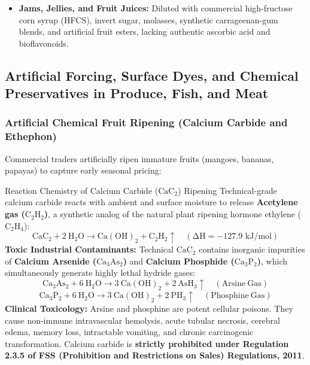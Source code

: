 \documentclass[11pt,a4paper,oneside]{article}
\begin{document}
\begin{itemize}[leftmargin=*]
\begin{itemize}
        \item \textit{Counterfeit Silver Foil (*Vark*):} Pure edible silver leaf ($99.9\%\ \mathrm{Ag}$, thickness $\approx 0.2\,\mu\text{m}$) is adulterated with or entirely replaced by \textbf{Toxic Aluminum Foil ($\mathrm{Al}$)}. Aluminum is a cumulative neurotoxin linked to microcytic anemia, neurofibrillary degeneration, and bone demineralization (osteomalacia).
    \end{itemize}
    \item \textbf{Jams, Jellies, and Fruit Juices:} Diluted with commercial high-fructose corn syrup (HFCS), invert sugar, molasses, synthetic carrageenan-gum blends, and artificial fruit esters, lacking authentic ascorbic acid and bioflavonoids.
\end{itemize}

\subsection{Artificial Forcing, Surface Dyes, and Chemical Preservatives in Produce, Fish, and Meat}

\subsubsection{Artificial Chemical Fruit Ripening (Calcium Carbide and Ethephon)}
Commercial traders artificially ripen immature fruits (mangoes, bananas, papayas) to capture early seasonal pricing:
\begin{formulabox}{Reaction Chemistry of Calcium Carbide ($\mathrm{CaC_2}$) Ripening}
Technical-grade calcium carbide reacts with ambient and surface moisture to release \textbf{Acetylene gas ($\mathrm{C_2H_2}$)}, a synthetic analog of the natural plant ripening hormone ethylene ($\mathrm{C_2H_4}$):
$$\mathrm{CaC_2 + 2\ H_2O \longrightarrow Ca(OH)_2 + C_2H_2\uparrow \quad (\Delta H = -127.9\text{ kJ/mol})}$$
\textbf{Toxic Industrial Contaminants:} Technical $\mathrm{CaC_2}$ contains inorganic impurities of \textbf{Calcium Arsenide ($\mathrm{Ca_3As_2}$)} and \textbf{Calcium Phosphide ($\mathrm{Ca_3P_2}$)}, which simultaneously generate highly lethal hydride gases:
$$\mathrm{Ca_3As_2 + 6\ H_2O \longrightarrow 3\ Ca(OH)_2 + 2\ AsH_3\uparrow \quad (Arsine\ Gas)}$$
$$\mathrm{Ca_3P_2 + 6\ H_2O \longrightarrow 3\ Ca(OH)_2 + 2\ PH_3\uparrow \quad (Phosphine\ Gas)}$$
\textbf{Clinical Toxicology:} Arsine and phosphine are potent cellular poisons. They cause non-immune intravascular hemolysis, acute tubular necrosis, cerebral edema, memory loss, intractable vomiting, and chronic carcinogenic transformation. Calcium carbide is \textbf{strictly prohibited under Regulation 2.3.5 of FSS (Prohibition and Restrictions on Sales) Regulations, 2011}.
\end{formulabox}
\end{document}
